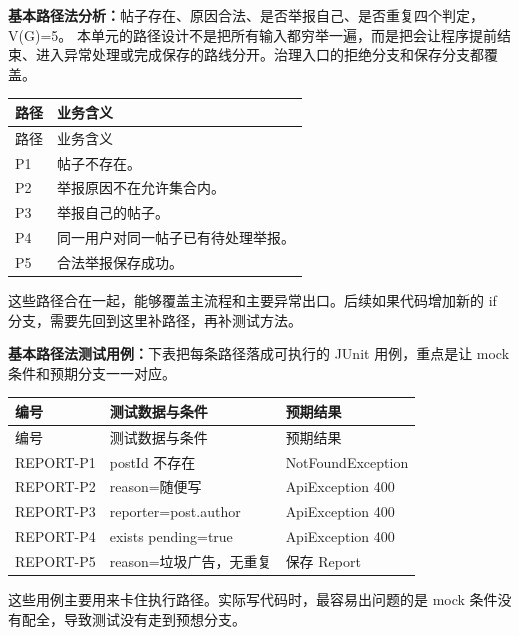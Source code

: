 \documentclass[bwprint]{report}
\begin{document}
\textbf{基本路径法分析：}帖子存在、原因合法、是否举报自己、是否重复四个判定，V(G)=5。 本单元的路径设计不是把所有输入都穷举一遍，而是把会让程序提前结束、进入异常处理或完成保存的路线分开。治理入口的拒绝分支和保存分支都覆盖。

{
\setlength{\tabcolsep}{3pt}
\begin{longtable}{P{1.2cm}P{12.0cm}}
\toprule
路径 & 业务含义\\
\midrule
\endfirsthead
\toprule
路径 & 业务含义\\
\midrule
\endhead
P1 & 帖子不存在。 \\
P2 & 举报原因不在允许集合内。 \\
P3 & 举报自己的帖子。 \\
P4 & 同一用户对同一帖子已有待处理举报。 \\
P5 & 合法举报保存成功。 \\
\bottomrule
\end{longtable}
}
这些路径合在一起，能够覆盖主流程和主要异常出口。后续如果代码增加新的 if 分支，需要先回到这里补路径，再补测试方法。

\textbf{基本路径法测试用例：}下表把每条路径落成可执行的 JUnit 用例，重点是让 mock 条件和预期分支一一对应。
{
\setlength{\tabcolsep}{3pt}
\begin{longtable}{P{2.4cm}P{4.9cm}P{5.8cm}}
\toprule
编号 & 测试数据与条件 & 预期结果\\
\midrule
\endfirsthead
\toprule
编号 & 测试数据与条件 & 预期结果\\
\midrule
\endhead
REPORT-\hspace{0pt}P1 & post\hspace{0pt}Id 不存在 & Not\hspace{0pt}Found\hspace{0pt}Exception \\
REPORT-\hspace{0pt}P2 & reason=随便写 & Api\hspace{0pt}Exception 400 \\
REPORT-\hspace{0pt}P3 & reporter=\hspace{0pt}post.author & Api\hspace{0pt}Exception 400 \\
REPORT-\hspace{0pt}P4 & exists pending=\hspace{0pt}true & Api\hspace{0pt}Exception 400 \\
REPORT-\hspace{0pt}P5 & reason=垃圾广告，无重复 & 保存 Report \\
\bottomrule
\end{longtable}
}
这些用例主要用来卡住执行路径。实际写代码时，最容易出问题的是 mock 条件没有配全，导致测试没有走到预想分支。
\end{document}
